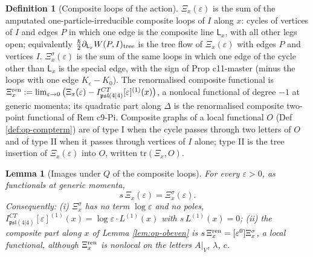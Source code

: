 \documentclass[11pt]{article}
\numberwithin{equation}{section}
\theoremstyle{plain}
\newtheorem{lemma}[theorem]{Lemma}
\theoremstyle{definition}
\newtheorem{definition}[theorem]{Definition}
\newcommand{\AV}{A|_V}
\newcommand{\psl}{\mathfrak{psl}(4|4)}
\begin{document}
\begin{definition}[Composite loops of the action]
\label{def:op-Xi}
$\Xi_x(\varepsilon)$ is the sum of the amputated one-particle-irreducible composite loops of $I$ along $x$: cycles of vertices of $I$ and edges $P$ in which one edge is the composite line $\mathsf L_x$, with all other legs open; equivalently $\tfrac\hbar2\partial_{\mathsf L_x}W(P,I)_{\rm tree}$ is the tree flow of $\Xi_x(\varepsilon)$ with edges $P$ and vertices $I$. $\Xi^\sigma_x(\varepsilon)$ is the sum of the same loops in which one edge of the cycle other than $\mathsf L_x$ is the special edge, with the sign of Prop c11-master (minus the loops with one edge $K_\varepsilon-K_0$). The renormalised composite functional is $\Xi^{\rm ren}_x:=\lim_{\varepsilon\to0}\big(\Xi_x(\varepsilon)-I^{CT}_{\psl}[\varepsilon]^{(1)}(x)\big)$, a nonlocal functional of degree $-1$ at generic momenta; its quadratic part along $\Delta$ is the renormalised composite two-point functional of Rem c9-Pi. Composite graphs of a local functional $O$ (Def \ref{def:op-compterm}) are of type I when the cycle passes through two letters of $O$ and of type II when it passes through vertices of $I$ alone; type II is the tree insertion of $\Xi_x(\varepsilon)$ into $O$, written $\mathrm{tr}(\Xi_x,O)$.
\end{definition}

\begin{lemma}[Images under $Q$ of the composite loops]
\label{lem:op-Cid}
For every $\varepsilon>0$, as functionals at generic momenta,
\[
s\,\Xi_x(\varepsilon)=\Xi^\sigma_x(\varepsilon).
\]
Consequently: (i) $\Xi^\sigma_x$ has no term $\log\varepsilon$ and no poles, $I^{CT}_{\psl}[\varepsilon]^{(1)}(x)=\log\varepsilon\cdot L^{(1)}(x)$ with $s\,L^{(1)}(x)=0$; (ii) the composite part along $x$ of Lemma \ref{lem:op-obeven} is $s\,\Xi^{\rm ren}_x=[\varepsilon^0]\Xi^\sigma_x$, a local functional, although $\Xi^{\rm ren}_x$ is nonlocal on the letters $\AV$, $\lambda$, $c$.
\end{lemma}
\end{document}
